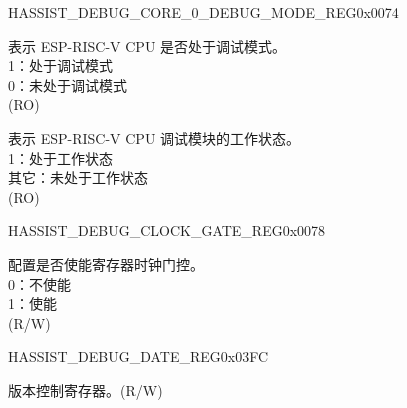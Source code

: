 \begin{register}{H}{ASSIST\_DEBUG\_CORE\_0\_DEBUG\_MODE\_REG}{0x0074}\label{regdesc:ASSISTDEBUGCORE0DEBUGMODEREG}
%
%
%
\regnewline%
\begin{regdesc}\begin{reglist}
\label{fielddesc:ASSISTDEBUGCORE0DEBUGMODE}\item [ASSIST\_DEBUG\_CORE\_0\_DEBUG\_MODE] 表示 ESP-RISC-V CPU 是否处于调试模式。\\
1：处于调试模式\\
0：未处于调试模式\\
(RO)
\label{fielddesc:ASSISTDEBUGCORE0DEBUGMODULEACTIVE}\item [ASSIST\_DEBUG\_CORE\_0\_DEBUG\_MODULE\_ACTIVE] 表示 ESP-RISC-V CPU 调试模块的工作状态。\\
1：处于工作状态\\
其它：未处于工作状态\\
(RO)
\end{reglist}\end{regdesc}
\end{register}

\begin{register}{H}{ASSIST\_DEBUG\_CLOCK\_GATE\_REG}{0x0078}\label{regdesc:ASSISTDEBUGCLOCKGATEREG}
%
%
\regnewline%
\begin{regdesc}\begin{reglist}
\label{fielddesc:ASSISTDEBUGCLKEN}\item [ASSIST\_DEBUG\_CLK\_EN]  配置是否使能寄存器时钟门控。\\
0：不使能\\
1：使能\\
(R/W)
\end{reglist}\end{regdesc}
\end{register}

\begin{register}{H}{ASSIST\_DEBUG\_DATE\_REG}{0x03FC}\label{regdesc:ASSISTDEBUGDATEREG}
%
%
\regnewline%
\begin{regdesc}\begin{reglist}
\label{fielddesc:ASSISTDEBUGDATE}\item [ASSIST\_DEBUG\_DATE] 版本控制寄存器。(R/W)
\end{reglist}\end{regdesc}
\end{register}


